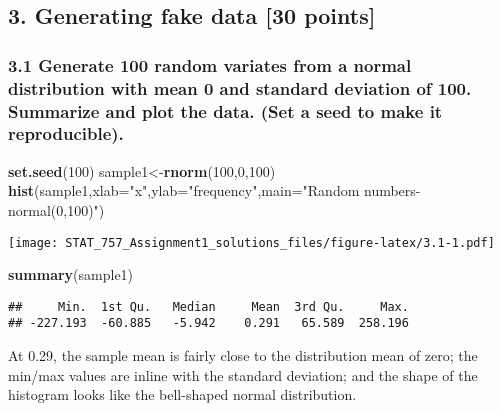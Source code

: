 \documentclass[]{article}
\newenvironment{Shaded}{\begin{snugshade}}{\end{snugshade}}
\newcommand{\DataTypeTok}[1]{\textcolor[rgb]{0.13,0.29,0.53}{#1}}
\newcommand{\DecValTok}[1]{\textcolor[rgb]{0.00,0.00,0.81}{#1}}
\newcommand{\KeywordTok}[1]{\textcolor[rgb]{0.13,0.29,0.53}{\textbf{#1}}}
\newcommand{\NormalTok}[1]{#1}
\newcommand{\StringTok}[1]{\textcolor[rgb]{0.31,0.60,0.02}{#1}}
\begin{document}
\hypertarget{generating-fake-data-30-points}{%
\subsection{3. Generating fake data {[}30
points{]}}\label{generating-fake-data-30-points}}

\hypertarget{generate-100-random-variates-from-a-normal-distribution-with-mean-0-and-standard-deviation-of-100.-summarize-and-plot-the-data.-set-a-seed-to-make-it-reproducible.}{%
\subsubsection{3.1 Generate 100 random variates from a normal
distribution with mean 0 and standard deviation of 100. Summarize and
plot the data. (Set a seed to make it
reproducible).}\label{generate-100-random-variates-from-a-normal-distribution-with-mean-0-and-standard-deviation-of-100.-summarize-and-plot-the-data.-set-a-seed-to-make-it-reproducible.}}

\begin{Shaded}
\begin{Highlighting}[]
\KeywordTok{set.seed}\NormalTok{(}\DecValTok{100}\NormalTok{)}
\NormalTok{sample1<-}\KeywordTok{rnorm}\NormalTok{(}\DecValTok{100}\NormalTok{,}\DecValTok{0}\NormalTok{,}\DecValTok{100}\NormalTok{)}
\KeywordTok{hist}\NormalTok{(sample1,}\DataTypeTok{xlab=}\StringTok{"x"}\NormalTok{,}\DataTypeTok{ylab=}\StringTok{"frequency"}\NormalTok{,}\DataTypeTok{main=}\StringTok{"Random numbers-normal(0,100)"}\NormalTok{)}
\end{Highlighting}
\end{Shaded}

\texttt{[image: STAT\_757\_Assignment1\_solutions\_files/figure-latex/3.1-1.pdf]}

\begin{Shaded}
\begin{Highlighting}[]
\KeywordTok{summary}\NormalTok{(sample1)}
\end{Highlighting}
\end{Shaded}

\begin{verbatim}
##     Min.  1st Qu.   Median     Mean  3rd Qu.     Max. 
## -227.193  -60.885   -5.942    0.291   65.589  258.196
\end{verbatim}

At 0.29, the sample mean is fairly close to the distribution mean of
zero; the min/max values are inline with the standard deviation; and the
shape of the histogram looks like the bell-shaped normal distribution.
\end{document}
